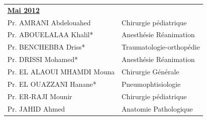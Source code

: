\begin{table}[H]
  \begin{tabular}{l l}
    \multicolumn{2}{l}{\textbf{\underline{Mai 2012}}}\vspace*{0.5em}\\

    Pr. AMRANI Abdelouahed & \hspace*{2em} Chirurgie pédiatrique \\
    Pr. ABOUELALAA Khalil* & \hspace*{2em} Anesthésie Réanimation \\
    Pr. BENCHEBBA Driss* & \hspace*{2em} Traumatologie-orthopédie \\
    Pr. DRISSI Mohamed* & \hspace*{2em} Anesthésie Réanimation \\
    Pr. EL ALAOUI MHAMDI Mouna & \hspace*{2em} Chirurgie Générale \\
    Pr. EL OUAZZANI Hanane* & \hspace*{2em} Pneumophtisiologie \\
    Pr. ER-RAJI Mounir & \hspace*{2em} Chirurgie pédiatrique \\
    Pr. JAHID Ahmed & \hspace*{2em} Anatomie Pathologique \\
  \end{tabular}
\end{table}




